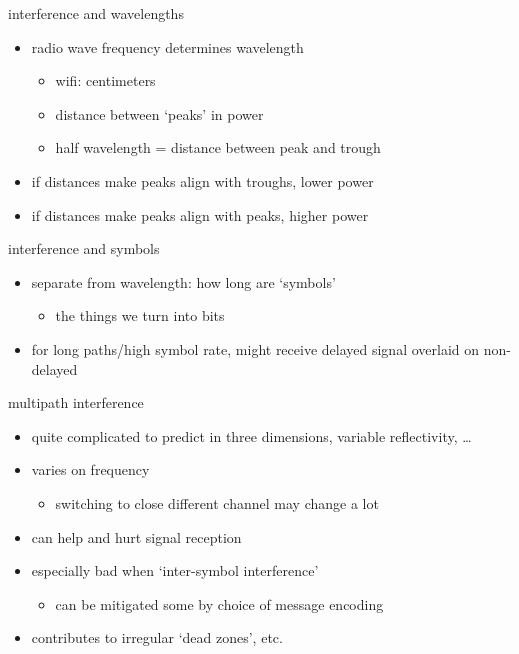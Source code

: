 \begin{frame}{interference and wavelengths}
    \begin{itemize}
    \item radio wave frequency determines wavelength
        \begin{itemize}
        \item wifi: centimeters
        \item distance between `peaks' in power
        \item half wavelength = distance between peak and trough
        \end{itemize}
    \item if distances make peaks align with troughs, lower power
    \item if distances make peaks align with peaks, higher power
    \end{itemize}
\end{frame}

\begin{frame}{interference and symbols}
    \begin{itemize}
    \item separate from wavelength: how long are `symbols'
        \begin{itemize}
        \item the things we turn into bits
        \end{itemize}
    \item for long paths/high symbol rate, might receive delayed signal overlaid on non-delayed
    \end{itemize}
\end{frame}


\begin{frame}{multipath interference}
    \begin{itemize}
    \item quite complicated to predict in three dimensions, variable reflectivity, \ldots
    \item varies on frequency
        \begin{itemize}
        \item switching to close different channel may change a lot
        \end{itemize}
    \item can help and hurt signal reception
    \item especially bad when `inter-symbol interference'
        \begin{itemize}
        \item can be mitigated some by choice of message encoding
        \end{itemize}
    \vspace{.5cm}
    \item contributes to irregular `dead zones', etc.
    \end{itemize}
\end{frame}

